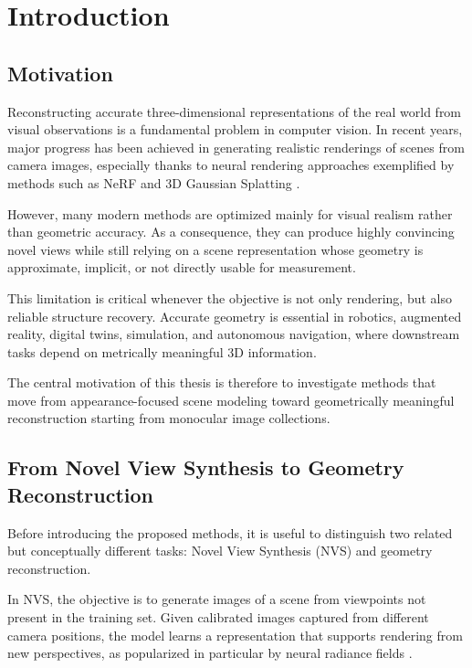 ﻿\chapter{Introduction}

\section{Motivation}
Reconstructing accurate three-dimensional representations of the real world from visual observations is a fundamental problem in computer vision. In recent years, major progress has been achieved in generating realistic renderings of scenes from camera images, especially thanks to neural rendering approaches exemplified by methods such as NeRF \cite{mildenhall2020nerf} and 3D Gaussian Splatting \cite{kerbl2023gaussian}.

However, many modern methods are optimized mainly for visual realism rather than geometric accuracy. As a consequence, they can produce highly convincing novel views while still relying on a scene representation whose geometry is approximate, implicit, or not directly usable for measurement.

This limitation is critical whenever the objective is not only rendering, but also reliable structure recovery. Accurate geometry is essential in robotics, augmented reality, digital twins, simulation, and autonomous navigation, where downstream tasks depend on metrically meaningful 3D information.

The central motivation of this thesis is therefore to investigate methods that move from appearance-focused scene modeling toward geometrically meaningful reconstruction starting from monocular image collections.

\section{From Novel View Synthesis to Geometry Reconstruction}
Before introducing the proposed methods, it is useful to distinguish two related but conceptually different tasks: Novel View Synthesis (NVS) and geometry reconstruction.

In NVS, the objective is to generate images of a scene from viewpoints not present in the training set. Given calibrated images captured from different camera positions, the model learns a representation that supports rendering from new perspectives, as popularized in particular by neural radiance fields \cite{mildenhall2020nerf}.

